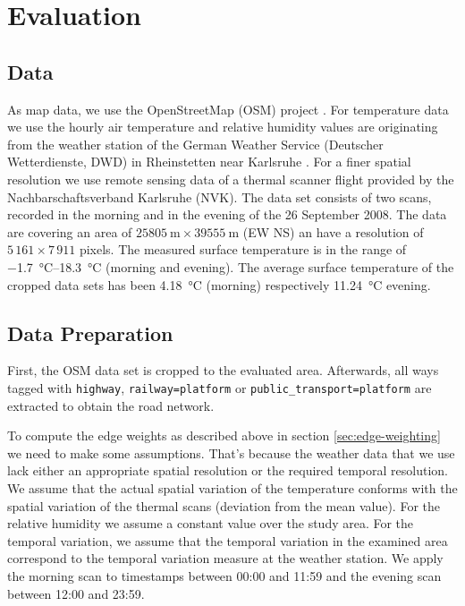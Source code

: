 
\section{Evaluation}

\subsection{Data}
\label{sec:data-sets}
As map data, we use the OpenStreetMap (OSM) project \parencite{OSMF2016}. 
For temperature data we use the hourly air temperature and relative humidity values are originating from the weather station of the German Weather Service (Deutscher Wetterdienste, DWD) in Rheinstetten near Karlsruhe \parencite{DWD2016}. For a finer spatial resolution we use remote sensing data of a thermal scanner flight provided by the Nachbarschaftsverband Karlsruhe (NVK). The data set consists of two scans, recorded in the morning and in the evening of the 26 September 2008. The data are covering an area of  $\SI{25 805}{\meter} \times \SI{39 555}{\meter}$ (EW NS) an have a resolution of $5\,161 \times 7\,911$  pixels. The measured surface temperature is in the range of \SIrange{-1.7}{18.3}{\celsius} (morning and evening). The average surface temperature of the cropped data sets has been \SI{4.18}{\celsius} (morning) respectively \SI{11.24}{\celsius} evening.  


\subsection{Data Preparation}
First, the OSM data set is cropped to the evaluated area. Afterwards, all ways tagged with \verb|highway|, \verb|railway=platform| or \verb|public_transport=platform| are extracted to obtain the road network.

To compute the edge weights as described above in section \ref{sec:edge-weighting} we need to make some assumptions. That's because the weather data that we use lack either an appropriate spatial resolution or the required temporal resolution. We assume that the actual spatial variation of the temperature conforms with the spatial variation of the thermal scans (deviation from the mean value). For the relative humidity we assume a constant value over the study area. For the temporal variation, we assume that the temporal variation in the examined area correspond to the temporal variation measure at the weather station. We apply the morning scan to timestamps between  00:00 and 11:59 and the evening scan between 12:00 and 23:59.

